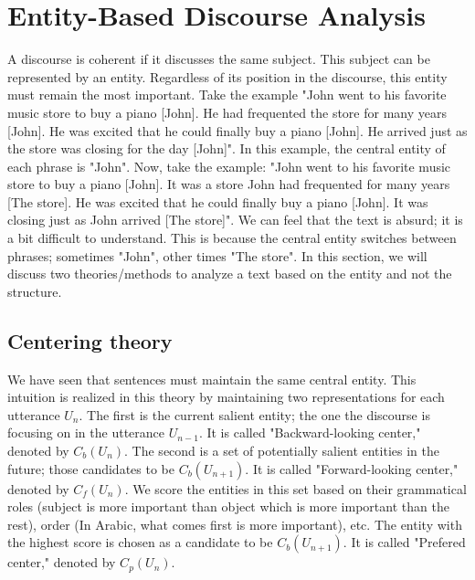\documentclass{KBook}
\begin{document}
\section{Entity-Based Discourse Analysis}

A discourse is coherent if it discusses the same subject. This subject can be represented by an entity. Regardless of its position in the discourse, this entity must remain the most important. Take the example "John went to his favorite music store to buy a piano [John]. He had frequented the store for many years [John]. He was excited that he could finally buy a piano [John]. He arrived just as the store was closing for the day [John]". In this example, the central entity of each phrase is "John". Now, take the example: "John went to his favorite music store to buy a piano [John]. It was a store John had frequented for many years [The store]. He was excited that he could finally buy a piano [John]. It was closing just as John arrived [The store]". We can feel that the text is absurd; it is a bit difficult to understand. This is because the central entity switches between phrases; sometimes "John", other times "The store". In this section, we will discuss two theories/methods to analyze a text based on the entity and not the structure.


\subsection{Centering theory}

We have seen that sentences must maintain the same central entity. This intuition is realized in this theory by maintaining two representations for each utterance $U_n$. The first is the current salient entity; the one the discourse is focusing on in the utterance $U_{n-1}$. It is called "Backward-looking center," denoted by $C_b(U_n)$. The second is a set of potentially salient entities in the future; those candidates to be $C_b(U_{n+1})$. It is called "Forward-looking center," denoted by $C_f(U_n)$. We score the entities in this set based on their grammatical roles (subject is more important than object which is more important than the rest), order (In Arabic, what comes first is more important), etc. The entity with the highest score is chosen as a candidate to be $C_b(U_{n+1})$. It is called "Prefered center," denoted by $C_p(U_n)$.
\end{document}
